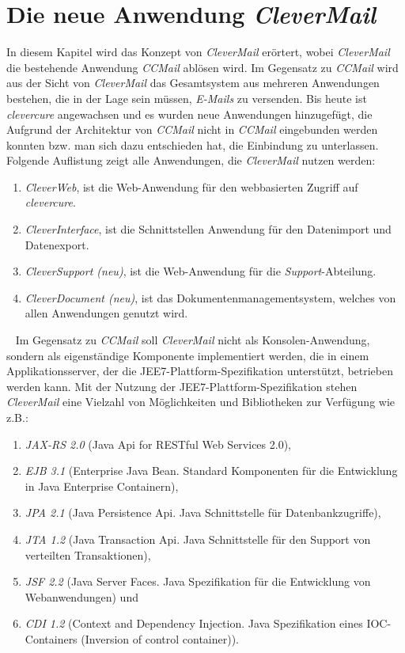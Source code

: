 \chapter{Die neue Anwendung \emph{CleverMail}}
\label{cha:clevermail}
In diesem Kapitel wird das Konzept von \emph{CleverMail} erörtert, wobei \emph{CleverMail} die bestehende Anwendung \emph{CCMail} ablösen wird. Im Gegensatz zu \emph{CCMail} wird aus der Sicht von \emph{CleverMail} das Gesamtsystem aus mehreren Anwendungen bestehen, die in der Lage sein müssen, \emph{E-Mails} zu versenden. Bis heute ist \emph{clevercure} angewachsen und es wurden neue Anwendungen hinzugefügt, die Aufgrund der Architektur von \emph{CCMail} nicht in \emph{CCMail} eingebunden werden konnten bzw. man sich dazu entschieden hat, die Einbindung zu unterlassen.
\newline
\newline
Folgende Auflistung zeigt alle Anwendungen, die \emph{CleverMail} nutzen werden:
\begin{enumerate}
	\item\emph{CleverWeb}, ist die Web-Anwendung für den webbasierten Zugriff auf \emph{clevercure}.
	\item\emph{CleverInterface}, ist die Schnittstellen Anwendung für den Datenimport und Datenexport.
	\item\emph{CleverSupport (neu)}, ist die Web-Anwendung für die \emph{Support}-Abteilung.
	\item\emph{CleverDocument (neu)}, ist das Dokumentenmanagementsystem, welches von allen Anwendungen genutzt wird.
\end{enumerate}
\ \newline
Im Gegensatz zu \emph{CCMail} soll \emph{CleverMail} nicht als Konsolen-Anwendung, sondern als eigenständige Komponente implementiert werden, die in einem Applikationsserver, der die JEE7-Plattform-Spezifikation unterstützt, betrieben werden kann.
\newpage
Mit der Nutzung der JEE7-Plattform-Spezifikation stehen \emph{CleverMail} eine Vielzahl von Möglichkeiten und Bibliotheken zur Verfügung wie z.B.: 
\begin{enumerate}
	\item\emph{JAX-RS 2.0} (Java Api for RESTful Web Services 2.0),
	\item\emph{EJB 3.1} (Enterprise Java Bean. Standard Komponenten für die Entwicklung in Java Enterprise Containern), 
	\item\emph{JPA 2.1} (Java Persistence Api. Java Schnittstelle für Datenbankzugriffe), 
	\item\emph{JTA 1.2} (Java Transaction Api. Java Schnittstelle für den Support von verteilten Transaktionen), 
	\item\emph{JSF 2.2} (Java Server Faces. Java Spezifikation für die Entwicklung von Webanwendungen) und 
	\item\emph{CDI 1.2} (Context and Dependency Injection. Java Spezifikation eines IOC-Containers (Inversion of control container)).
\end{enumerate}
